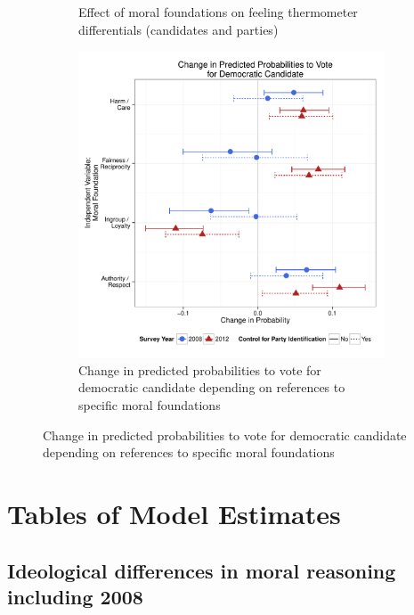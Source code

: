 \documentclass[12pt]{article}
\begin{document}
\begin{figure}[ht]
\begin{subfigure}[t]{0.49\textwidth}
    \caption{Effect of moral foundations on feeling thermometer differentials (candidates and parties)}\label{fig:appD11feel}
  \end{subfigure}
  \begin{subfigure}[t]{0.49\textwidth}
    \includegraphics[scale=.35]{../calc/fig/appD12vote.pdf}
    \caption{Change in predicted probabilities to vote for democratic candidate depending on references to specific moral foundations}\label{fig:appD12vote}
  \end{subfigure}
\end{figure}


\clearpage
\section{Tables of Model Estimates}\label{app:tables}
\renewcommand\thefigure{\thesection.\arabic{figure}}
\renewcommand\thetable{\thesection.\arabic{table}}
\setcounter{figure}{0}
\setcounter{table}{0}


\subsection{Ideological differences in moral reasoning including 2008}










\end{document}
